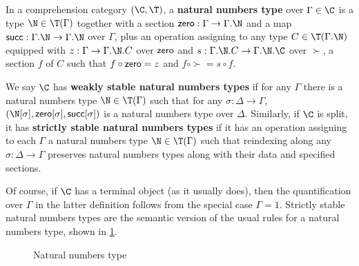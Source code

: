 \begin{defn}
  In a comprehension category $(\C,\T)$, a \textbf{natural numbers type} over $\Gamma\in\C$ is a type $\N\in\T(\Gamma)$ together with a section $\zero:\Gamma\to\Gamma.\N$ and a map $\succ:\Gamma.\N\to\Gamma.\N$ over $\Gamma$, plus an operation assigning to any type $C\in\T(\Gamma.\N)$ equipped with $z:\Gamma\to\Gamma.\N.C$ over $\mathsf{zero}$ and $s:\Gamma.\N.C \to \Gamma.\N.\C$ over $\succ$, a section $f$ of $C$ such that $f \circ \mathsf{zero} = z$ and $f\circ \succ = s \circ f$.

  We say $\C$ has \textbf{weakly stable natural numbers types} if for any $\Gamma$ there is a natural numbers type $\N\in\T(\Gamma)$ such that for any $\sigma:\Delta\to\Gamma$, $(\N[\sigma],\zero[\sigma],\succ[\sigma])$ is a natural numbers type over $\Delta$.
  Similarly, if $\C$ is split, it has \textbf{strictly stable natural numbers types} if it has an operation assigning to each $\Gamma$ a natural numbers type $\N\in\T(\Gamma)$ such that reindexing along any $\sigma:\Delta\to\Gamma$ preserves natural numbers types along with their data and specified sections.
\end{defn}

Of course, if $\C$ has a terminal object (as it usually does), then the quantification over $\Gamma$ in the latter definition follows from the special case $\Gamma=1$.
Strictly stable natural numbers types are the semantic version of the usual rules for a natural numbers type, shown in \cref{fig:nno}.

\begin{figure}
  \centering
  \caption{Natural numbers type}
  \label{fig:nno}
\end{figure}

